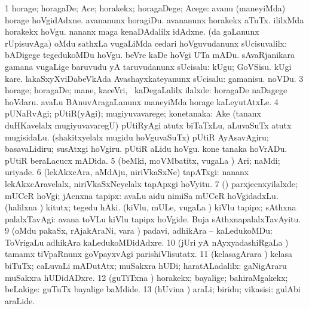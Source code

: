 \bentry
{}
\gl{\kirxvi}
\bmng
\bnum
\num{1} horage; horagaDe; Ace; horakekx; horagaDege; Acege:  avanu (maneyiMda) horage hoVgidAdxne.  avananunx horagiDu.  avananunx horakekx aTuTx.  ililxMda horakekx hoVgu.  nananx maga kenaDAdalilx idAdxne. 
 (\pagu da \kirx gaLanunx rUpisuvAga) 
\banum
{} oMdu sathxLa \mo vugaLiMda cedari hoVguvudanunx sUcisuvalilx:  bADigege tegedukoMDu hoVgu.  beVre kaDe hoVgi UTa mADu. 
 sAvaRjanikara gamana \mo vugaLige baruvudu yA taruvudanunx sUcisalu:   kUgu; GoVSisu.  kUgi kare.  lakaSxyXviDabeVkAda Avashayxkateyanunx sUcisalu:  gamanisu.  noVDu. 
\eanum
\numie
\num{3} horage; horagaDe; mane, kaceVri, \mo\ kaDegaLalilx ilalxde:  horagaDe naDagege hoVdaru.  avaLu BAnuvAragaLanunx maneyiMda horage kaLeyutAtxLe. 
\num{4} pUNaRvAgi; pUtiR(yAgi); mugiyuvavarege; konetanaka:  Ake (tananx duHKavelalx mugiyuvavaregU) pUtiRyAgi atutx biTaTxLu, aLuvaSuTx atutx mugisidaLu.  (shakitxyelalx mugidu hoVguvaSuTx) pUtiR AyAsavAgiru; basavaLidiru; susAtxgi hoVgiru.  pUtiR aLidu hoVgu.  kone tanaka hoVrADu.  pUtiR beraLacucx mADida. 
\num{5} (beMki, moVMbatitx, \mo vugaLa \vi) Ari; naMdi; uriyade. 
\num{6} (lekAkxcAra, aMdAju, niriVkaSxNe) tapATxgi:  nananx lekAkxcAravelalx, niriVkaSxNeyelalx tapApxgi hoVyitu. 
\num{7} (\AmA) parxjecnxyilalxde; mUCeR hoVgi; jAcnxna tapipx:  avaLu aidu nimiSa mUCeR hoVgidadxLu. 
\banum
{} (halilxna \vi) kitutx; tegedu hAki. 
 (kiVlu, mULe, \mo vugaLa \vi) kiVlu tapipx; sAthxna palalxTavAgi:  avana toVLu kiVlu tapipx hoVgide.  Buja sAthxnapalalxTavAyitu. 
\eanum
\numie
\num{9} (oMdu pakaSx, rAjakAraNi, \mo vara \vi) padavi, adhikAra -- kaLedukoMDu:  ToVrigaLu adhikAra kaLedukoMDidAdxre. 
\num{10} (jUri yA nAyxyadashiRgaLa \vi) tamamx tiVpaRnunx goVpayxvAgi parishiVlisutatx. 
\num{11} (kelasagArara \vi) kelasa biTuTx; caLuvaLi mADutAtx; muSakxra hUDi; haratALadalilx:  gaNigAraru muSakxra hUDidADxre. 
\num{12} (guTiTxna \vi) horakekx; bayalige; bahiraMgakekx; beLakige:  guTuTx bayalige baMdide. 
\num{13} (hUvina \vi) araLi; biridu; vikasisi:  gulAbi araLide. 
